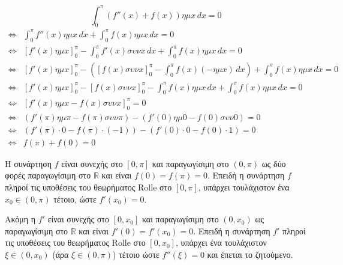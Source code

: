 \begin{alist}
\[
\int_0^\pi (f''(x) + f(x)) \eta\mu x \, dx = 0
\]
\begin{align*}
\Leftrightarrow &\int_0^\pi f''(x)\eta\mu x \, dx + \int_0^\pi f(x)\eta\mu x \, dx = 0 \\
\Leftrightarrow &\left[ f'(x)\eta\mu x \right]_0^\pi - \int_0^\pi f'(x)\sigma\upsilon\nu x \, dx + \int_0^\pi f(x)\eta\mu x \, dx = 0 \\
\Leftrightarrow &\left[ f'(x)\eta\mu x \right]_0^\pi - \left( \left[ f(x)\sigma\upsilon\nu x \right]_0^\pi - \int_0^\pi f(x)(-\eta\mu x) \, dx \right) + \int_0^\pi f(x)\eta\mu x \, dx = 0 \\
\Leftrightarrow &\left[ f'(x)\eta\mu x \right]_0^\pi - \left[ f(x)\sigma\upsilon\nu x \right]_0^\pi - \int_0^\pi f(x)\eta\mu x \, dx + \int_0^\pi f(x)\eta\mu x \, dx = 0 \\
\Leftrightarrow &\left[ f'(x)\eta\mu x - f(x)\sigma\upsilon\nu x \right]_0^\pi = 0 \\
\Leftrightarrow &(f'(\pi)\eta\mu\pi - f(\pi)\sigma\upsilon\nu\pi) - (f'(0)\eta\mu 0 - f(0)\sigma\upsilon\nu 0) = 0 \\
\Leftrightarrow &(f'(\pi)\cdot 0 - f(\pi)\cdot(-1)) - (f'(0)\cdot 0 - f(0)\cdot 1) = 0 \\
\Leftrightarrow &f(\pi) + f(0) = 0
\end{align*}

\item[γ)] Η συνάρτηση $f$ είναι συνεχής στο $[0,\pi]$ και παραγωγίσιμη στο $(0,\pi)$ ως δύο φορές παραγωγίσιμη στο $\mathbb{R}$ και είναι $f(0)=f(\pi)=0$. Επειδή η συνάρτηση $f$ πληροί τις υποθέσεις του θεωρήματος Rolle στο $[0,\pi]$, υπάρχει τουλάχιστον ένα $x_0 \in (0,\pi)$ τέτοιο, ώστε $f'(x_0)=0$.

Ακόμη η $f'$ είναι συνεχής στο $[0,x_0]$ και παραγωγίσιμη στο $(0,x_0)$ ως παραγωγίσιμη στο $\mathbb{R}$ και είναι $f'(0)=f'(x_0)=0$. Επειδή η συνάρτηση $f'$ πληροί τις υποθέσεις του θεωρήματος Rolle στο $[0,x_0]$, υπάρχει ένα τουλάχιστον $\xi \in (0,x_0)$ (άρα $\xi \in (0,\pi)$) τέτοιο ώστε $f''(\xi)=0$ και έπεται το ζητούμενο.
\end{alist}